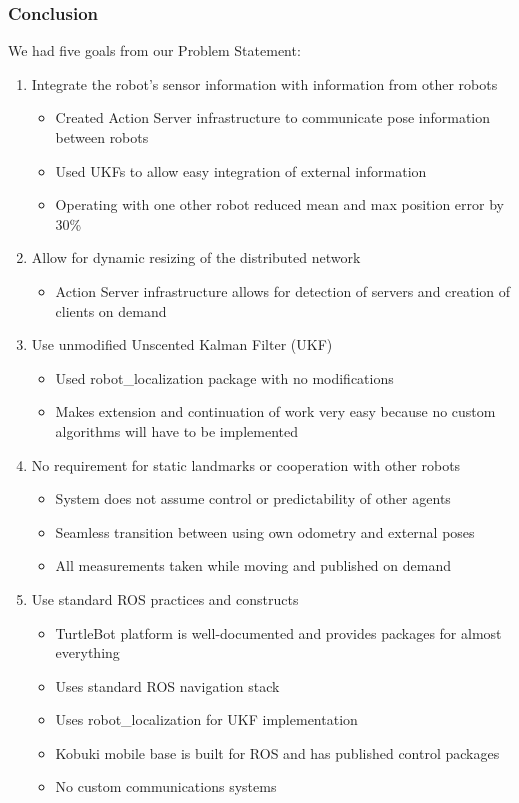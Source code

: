 \documentclass[14pt]{beamer}
\begin{document}
\begin{frame}[allowframebreaks]
\frametitle{Conclusion}
We had five goals from our Problem Statement:

\vspace{14pt}
\begin{enumerate}
\item Integrate the robot's sensor information with information from other robots
\begin{itemize}
\item Created Action Server infrastructure to communicate pose information between robots
\item Used UKFs to allow easy integration of external information
\item Operating with one other robot reduced mean and max position error by 30\%
\end{itemize}
\framebreak
\vspace*{14pt}
\item Allow for dynamic resizing of the distributed network
    \begin{itemize}
    \item Action Server infrastructure allows for detection of servers and creation of clients on demand
    \end{itemize}
\vspace{14pt}
\item Use unmodified Unscented Kalman Filter (UKF)
    \begin{itemize}
    \item Used robot\_localization package with no modifications
    \item Makes extension and continuation of work very easy because no custom algorithms will have to be implemented
    \end{itemize}
\framebreak
\item No requirement for static landmarks or cooperation with other robots
    \begin{itemize}
    \item System does not assume control or predictability of other agents
    \item Seamless transition between using own odometry and external poses
    \item All measurements taken while moving and published on demand
    \end{itemize}
\framebreak
\item Use standard ROS practices and constructs
    \begin{itemize}
    \item TurtleBot platform is well-documented and provides packages for almost everything
    \item Uses standard ROS navigation stack
    \item Uses robot\_localization for UKF implementation
    \item Kobuki mobile base is built for ROS and has published control packages
    \item No custom communications systems
    \end{itemize}
\end{enumerate}
\end{frame}
\end{document}

